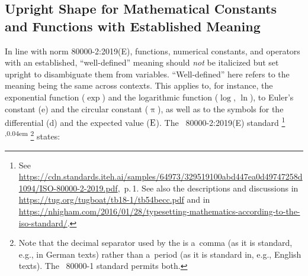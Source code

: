 \subsection{Upright Shape for Mathematical Constants and Functions with Established Meaning}
In line with  norm 80000-2:2019(E), functions, numerical constants, and operators with an established, ``well-defined'' meaning should \emph{not} be italicized but set upright to disambiguate them from variables. ``Well-defined'' here refers to the meaning being the same across contexts. This applies to, for instance, the exponential function ($\exp$) and the logarithmic function ($\log$, $\ln$), to Euler's constant ($\mathrm{e}$) and the circular constant ($\uppi$), as well as to the symbols for the differential ($\mathrm{d}$) and the expected value ($\operatorfont{E}$). The ~80000-2:2019(E) standard%
\footnote{See \url{https://cdn.standards.iteh.ai/samples/64973/329519100abd447ea0d49747258d1094/ISO-80000-2-2019.pdf},~p.\,1. See also the descriptions and discussions in \url{https://tug.org/tugboat/tb18-1/tb54becc.pdf} and in \url{https://nhigham.com/2016/01/28/typesetting-mathematics-according-to-the-iso-standard/}.}%
\textsuperscript{,\kern0.04em}%
\footnote{Note that the decimal separator used by the  is a~comma (as it is standard, e.g., in German texts) rather than a~period (as it is standard in, e.g., English texts). The ~80000-1 standard permits both.}
states:


